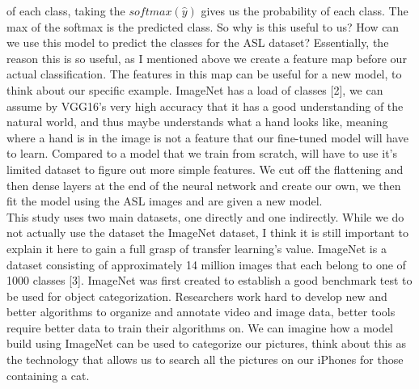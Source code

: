 \documentclass[12pt]{article}
\begin{document}
of each class, taking the $softmax(\hat{y})$ gives us the probability of each class. The max of the softmax is the predicted class. So why is this useful to us? How can we use this model to predict
the classes for the ASL dataset? Essentially, the reason this is so useful, as I mentioned above we create a feature map before our actual classification. The features in this map can be useful for a new model,
to think about our specific example. ImageNet has a load of classes [2], we can assume by VGG16's very high accuracy that it has a good understanding of the natural world, and thus maybe understands what a hand looks like, meaning 
where a hand is in the image is not a feature that our fine-tuned model will have to learn. Compared to a model that we train from scratch, will have to use it's limited dataset to figure out more simple features. We cut off
the flattening and then dense layers at the end of the neural network and create our own, we then fit the model using the ASL images and are given a new model. \\


This study uses two main datasets, one directly and one indirectly. While we do not actually use the dataset the ImageNet dataset, I think it is still important to explain it here to gain a full grasp of 
transfer learning's value. ImageNet is a dataset consisting of approximately 14 million images that each belong to one of 1000 classes [3]. ImageNet was first created to establish a good benchmark test
to be used for object categorization. Researchers work hard to develop new and better algorithms to organize and annotate video and image data, better tools require better data to train their algorithms on.
We can imagine how a model build using ImageNet can be used to categorize our pictures, think about this as the technology that allows us to search all the pictures on our iPhones for those containing a cat. 



\end{document}
